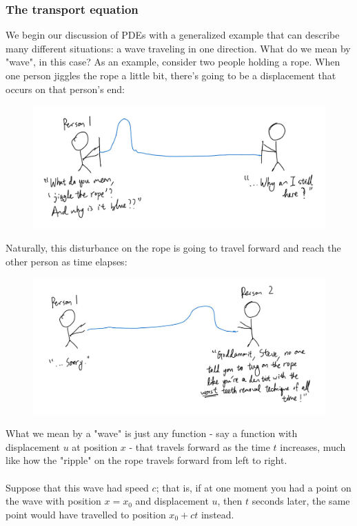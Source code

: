 \documentclass{article}
\begin{document}
\subsubsection{The transport equation}
We begin our discussion of PDEs with a generalized example that can describe many different situations: a wave traveling in one direction. What do we mean by "wave", in this case? As an example, consider two people holding a rope. When one person jiggles the rope a little bit, there's going to be a displacement that occurs on that person's end:
\begin{figure}[h]
    \centering
    \includegraphics[width=12cm]{DE-ch4-transportequation-1.jpg}
\end{figure}
Naturally, this disturbance on the rope is going to travel forward and reach the other person as time elapses:
\newpage
\begin{figure}[h]
    \centering
    \includegraphics[width=12cm]{DE-ch4-transport2.jpg}
\end{figure}
What we mean by a "wave" is just any function - say a function with displacement $u$ at position $x$ - that travels forward as the time $t$ increases, much like how the "ripple" on the rope travels forward from left to right. \\ \\
Suppose that this wave had speed $c$; that is, if at one moment you had a point on the wave with position $x=x_0$ and displacement $u$, then $t$ seconds later, the same point would have travelled to position $x_0 + ct$ instead. 
\end{document}
